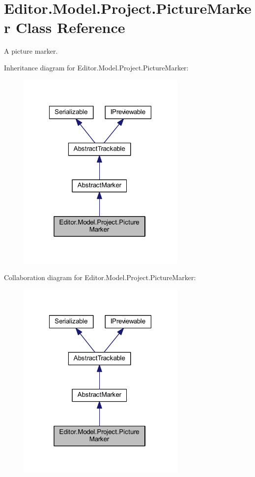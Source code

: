 \section{Editor.\-Model.\-Project.\-Picture\-Marker Class Reference}
\label{class_editor_1_1_model_1_1_project_1_1_picture_marker}


A picture marker.  




Inheritance diagram for Editor.\-Model.\-Project.\-Picture\-Marker\-:
\nopagebreak
\begin{figure}[H]
\begin{center}
\leavevmode
\includegraphics[width=235pt]{class_editor_1_1_model_1_1_project_1_1_picture_marker__inherit__graph}
\end{center}
\end{figure}


Collaboration diagram for Editor.\-Model.\-Project.\-Picture\-Marker\-:
\nopagebreak
\begin{figure}[H]
\begin{center}
\leavevmode
\includegraphics[width=235pt]{class_editor_1_1_model_1_1_project_1_1_picture_marker__coll__graph}
\end{center}
\end{figure}

